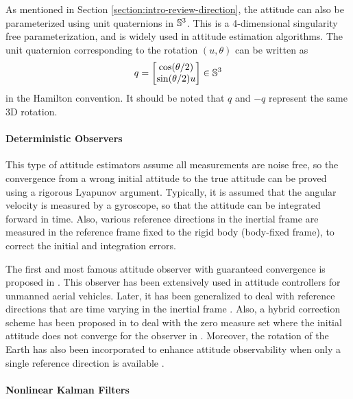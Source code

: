 As mentioned in Section \ref{section:intro-review-direction}, the attitude can also be parameterized using unit quaternions in $\mathbb{S}^3$.
This is a 4-dimensional singularity free parameterization, and is widely used in attitude estimation algorithms.
The unit quaternion corresponding to the rotation $(u,\theta)$ can be written as
\begin{align} \label{eqn:rv2qua}
	q = \begin{bmatrix} \cos(\theta/2) \\ \sin(\theta/2) u \end{bmatrix} \in \mathbb{S}^3
\end{align}
in the Hamilton convention.
It should be noted that $q$ and $-q$ represent the same 3D rotation.

\paragraph{Deterministic Observers}

This type of attitude estimators assume all measurements are noise free, so the convergence from a wrong initial attitude to the true attitude can be proved using a rigorous Lyapunov argument.
Typically, it is assumed that the angular velocity is measured by a gyroscope, so that the attitude can be integrated forward in time.
Also, various reference directions in the inertial frame are measured in the reference frame fixed to the rigid body (body-fixed frame), to correct the initial and integration errors.

The first and most famous attitude observer with guaranteed convergence is proposed in \cite{mahony2008nonlinear}.
This observer has been extensively used in attitude controllers for unmanned aerial vehicles.
Later, it has been generalized to deal with reference directions that are time varying in the inertial frame \cite{batista2012ges,grip2011attitude,trumpf2012analysis}.
Also, a hybrid correction scheme has been proposed in \cite{wu2015globally} to deal with the zero measure set where the initial attitude does not converge for the observer in \cite{mahony2008nonlinear}.
Moreover, the rotation of the Earth has also been incorporated to enhance attitude observability when only a single reference direction is available \cite{reis2018nonlinear}.

\paragraph{Nonlinear Kalman Filters}

